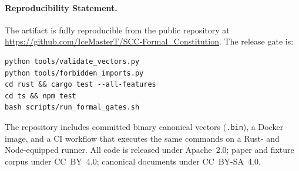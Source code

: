 \documentclass{article}
\begin{document}
\paragraph{Reproducibility Statement.}
The artifact is fully reproducible from the public repository at \url{https://github.com/IceMasterT/SCC-Formal_Constitution}.
The release gate is:
\begin{lstlisting}
python tools/validate_vectors.py
python tools/forbidden_imports.py
cd rust && cargo test --all-features
cd ts && npm test
bash scripts/run_formal_gates.sh
\end{lstlisting}
The repository includes committed binary canonical vectors (\texttt{.bin}), a Docker image, and a CI workflow that executes the same commands on a Rust- and Node-equipped runner.
All code is released under Apache~2.0; paper and fixture corpus under CC~BY~4.0; canonical documents under CC~BY-SA~4.0.
\end{document}
